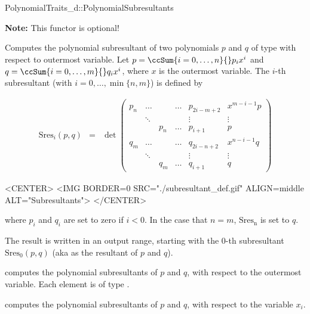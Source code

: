 \begin{ccRefConcept}{PolynomialTraits_d::PolynomialSubresultants}

\textbf{Note:} This functor is optional!

\ccDefinition

Computes the polynomial subresultant of two polynomials $p$ and $q$ of 
type  with respect to outermost variable.
Let 
$p=\ccSum{i=0,\ldots,n}{} p_i x^i$ and 
$q=\ccSum{i=0,\ldots,m}{} q_i x^i$, where $x$
is the outermost variable.
The $i$-th subresultant (with $i=0,\ldots,\min\{n,m\}$) is defined by

\begin{ccTexOnly}
\begin{eqnarray*}
\mathrm{Sres}_i(p,q)&=&\det \left(\begin{array}{ccccccc}
p_n & \ldots &&\ldots& p_{2i-m+2}&x^{m-i-1}p \\
&\ddots&&&\vdots&\vdots\\
&&p_n&\ldots&p_{i+1}&p\\
q_m & \ldots &&\ldots & q_{2i-n+2}&x^{n-i-1}q \\
&\ddots&&&\vdots&\vdots\\
&&q_m&\ldots&q_{i+1}&q
\end{array}\right)
\end{eqnarray*}
\end{ccTexOnly}

\begin{ccHtmlOnly}
<CENTER>
<IMG BORDER=0 SRC="./subresultant_def.gif" ALIGN=middle ALT="Subresultants">
</CENTER>
\end{ccHtmlOnly}

where $p_i$ and $q_i$ are set to zero if $i<0$.
In the case that $n=m$, $\mathrm{Sres_n}$ is set to $q$.

The result is written in an output range, starting with the $0$-th subresultant
$\mathrm{Sres}_0(p,q)$
(aka as the resultant of $p$ and $q$).


\ccOperations
{}
         { computes the polynomial subresultants of $p$ and $q$, 
           with respect to the outermost variable. Each element is of type
           .}

         { computes the polynomial subresultants of $p$ and $q$, 
           with respect to the variable $x_i$.}


\ccSeeAlso

\\
\\

\end{ccRefConcept}
